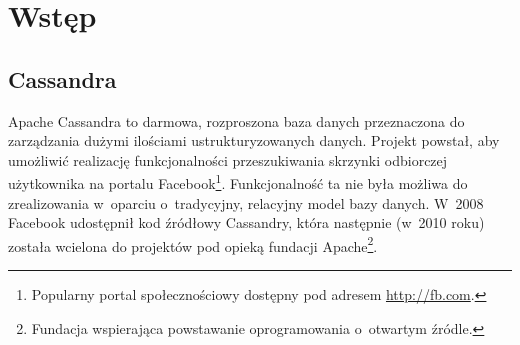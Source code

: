 \documentclass{report}
\begin{document}
\chapter{Wstęp}

\section{Cassandra}

Apache Cassandra to darmowa, rozproszona baza danych przeznaczona do zarządzania dużymi ilościami ustrukturyzowanych danych. Projekt powstał, aby umożliwić realizację funkcjonalności przeszukiwania skrzynki odbiorczej użytkownika na portalu Facebook\footnote{Popularny portal społecznościowy dostępny pod adresem \url{http://fb.com}.}. Funkcjonalność ta nie była możliwa do zrealizowania w~oparciu o~tradycyjny, relacyjny model bazy danych. W~2008 Facebook udostępnił kod źródłowy Cassandry, która następnie (w~2010 roku) została wcielona do projektów pod opieką fundacji Apache\footnote{Fundacja wspierająca powstawanie oprogramowania o~otwartym źródle.}.\cite{casshistory} 

\printbibliography
\end{document}
